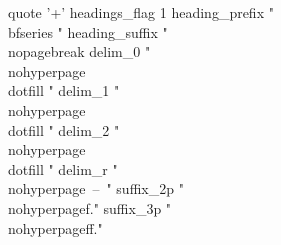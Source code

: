 quote '+'
headings_flag 1
heading_prefix "{\\bfseries "
heading_suffix "}\\nopagebreak%
delim_0 "\\nohyperpage{\\dotfill }"
delim_1 "\\nohyperpage{\\dotfill }"
delim_2 "\\nohyperpage{\\dotfill }"
delim_r "\\nohyperpage{~--~}"
suffix_2p "\\nohyperpage{f.}"
suffix_3p "\\nohyperpage{ff.}"
